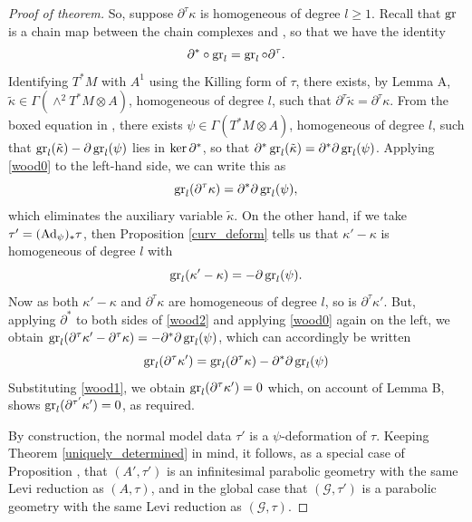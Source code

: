 \documentclass[leqno,12pt]{amsart} %
\begin{document}
\begin{proof}[Proof of theorem]
  So, suppose $\partial^\tau \kappa$ is homogeneous of degree $l\ge 1$. Recall that
  $\operatorname{\operatorname{gr}}$ is a chain map between the chain complexes  and
  , so that we have the identity
  \begin{equation}
    \label{wood0}
    \partial^*\circ \operatorname{\operatorname{gr}}_l = \operatorname{\operatorname{gr}}_l \circ \partial^\tau.
  \end{equation}
  Identifying $T^*\!M$ with $A^1$ using the Killing form of $\tau$, there exists, by Lemma
  A, $\tilde\kappa \in \Gamma(\wedge^2 T^*\!M \otimes A)$, homogeneous of degree $l$, such
  that $\partial^\tau \tilde \kappa = \partial^\tau \kappa $.  From the boxed equation in
  , there exists $\psi \in \Gamma(T^*\!M \otimes A)$,
  homogeneous of degree $l$, such that
  $\operatorname{\operatorname{gr}}_l(\tilde \kappa) - \partial \operatorname{\operatorname{gr}}_l(\psi)$ lies in $\operatorname{ker} \partial^*$, so
  that $\partial^* \operatorname{\operatorname{gr}}_l(\tilde \kappa) = \partial^* \partial \operatorname{\operatorname{gr}}_l (\psi
  )$. Applying \eqref{wood0} to the left-hand side, we can write this as
  \begin{equation}
    \label{wood1}
    \operatorname{\operatorname{gr}}_l(\partial^\tau \kappa ) = \partial^* \partial \operatorname{\operatorname{gr}}_l(\psi),
  \end{equation}
  which eliminates the auxiliary variable $\tilde \kappa$. On the other hand, if we take
  $\tau' =(\operatorname{Ad}_\psi)_*\tau $, then Proposition \ref{curv_deform} tells us that
  $\kappa' - \kappa $ is homogeneous of degree $l$ with
  \begin{equation}
    \label{wood2}
    \operatorname{\operatorname{gr}}_l(\kappa'-\kappa) = -\partial \operatorname{\operatorname{gr}}_l(\psi).
  \end{equation}
  Now as both $\kappa' - \kappa $ and $\partial^\tau \kappa $ are homogeneous of degree
  $l$, so is $\partial^\tau \kappa'$. But, applying $\partial^*$ to both sides of
  \eqref{wood2} and applying \eqref{wood0} again on the left, we obtain
  $\operatorname{\operatorname{gr}}_l(\partial^\tau \kappa' - \partial^\tau \kappa) = -\partial^* \partial
  \operatorname{\operatorname{gr}}_l(\psi)$, which can accordingly be written
  \begin{equation*}
    \operatorname{\operatorname{gr}}_l(\partial^\tau \kappa')
    = \operatorname{\operatorname{gr}}_l(\partial^\tau \kappa) - \partial^* \partial
  \operatorname{\operatorname{gr}}_l(\psi)
  \end{equation*}
  Substituting \eqref{wood1}, we obtain $\operatorname{\operatorname{gr}}_l(\partial^\tau \kappa')=0 $ which, on
  account of Lemma B, shows $\operatorname{\operatorname{gr}}_l(\partial^{\tau'}\kappa') =0$, as required.

  By construction, the normal model data $\tau'$ is a $\psi$-deformation of $\tau
  $. Keeping Theorem \ref{uniquely_determined} in mind, it follows, as a special case of
  Proposition , that $(A', \tau')$ is an infinitesimal parabolic
  geometry with the same Levi reduction as $(A, \tau)$, and in the global case that
  $({\mathcal G}, \tau')$ is a parabolic geometry with the same Levi reduction as
  $({\mathcal G}, \tau)$.

\end{proof}
\end{document}

